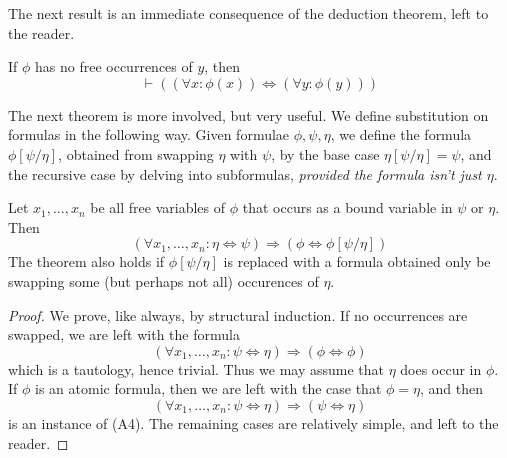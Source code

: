 The next result is an immediate consequence of the deduction theorem, left to the reader.

\begin{theorem}
    If $\phi$ has no free occurrences of $y$, then
    \[ \vdash ((\forall x: \phi(x)) \Leftrightarrow (\forall y: \phi(y))) \]
\end{theorem}

The next theorem is more involved, but very useful. We define substitution on formulas in the following way. Given formulae $\phi,\psi,\eta$, we define the formula $\phi[\psi/\eta]$, obtained from swapping $\eta$ with $\psi$, by the base case $\eta[\psi/\eta] = \psi$, and the recursive case by delving into subformulas, {\it provided the formula isn't just $\eta$}.

\begin{theorem}
    Let $x_1, \dots, x_n$ be all free variables of $\phi$ that occurs as a bound variable in $\psi$ or $\eta$. Then
    \[ (\forall x_1, \dots, x_n: \eta \Leftrightarrow \psi) \Rightarrow (\phi \Leftrightarrow \phi[\psi/\eta]) \]
    The theorem also holds if $\phi[\psi/\eta]$ is replaced with a formula obtained only be swapping some (but perhaps not all) occurences of $\eta$.
\end{theorem}
\begin{proof}
    We prove, like always, by structural induction. If no occurrences are swapped, we are left with the formula
    \[ (\forall x_1, \dots, x_n: \psi \Leftrightarrow \eta) \Rightarrow (\phi \Leftrightarrow \phi) \]
    which is a tautology, hence trivial. Thus we may assume that $\eta$ does occur in $\phi$. If $\phi$ is an atomic formula, then we are left with the case that $\phi = \eta$, and then
    \[ (\forall x_1, \dots, x_n: \psi \Leftrightarrow \eta) \Rightarrow (\psi \Leftrightarrow \eta) \]
    is an instance of (A4). The remaining cases are relatively simple, and left to the reader.
\end{proof}

